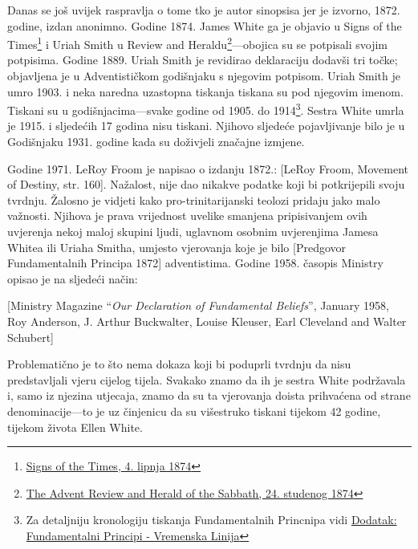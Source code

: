 Danas se još uvijek raspravlja o tome tko je autor sinopsisa jer je izvorno, 1872. godine, izdan anonimno. Godine 1874. James White ga je objavio u Signs of the Times\footnote{\href{https://adventistdigitallibrary.org/adl-364148/signs-times-june-4-1874}{Signs of the Times, 4. lipnja 1874}} i Uriah Smith u Review and Heraldu\footnote{\href{http://documents.adventistarchives.org/Periodicals/RH/RH18741124-V44-22.pdf}{The Advent Review and Herald of the Sabbath, 24. studenog 1874}}—obojica su se potpisali svojim potpisima. Godine 1889. Uriah Smith je revidirao deklaraciju dodavši tri točke; objavljena je u Adventističkom godišnjaku s njegovim potpisom. Uriah Smith je umro 1903. i neka naredna uzastopna tiskanja  tiskana su pod njegovim imenom. Tiskani su u godišnjacima—svake godine od 1905. do 1914\footnote{Za detaljniju kronologiju tiskanja Fundamentalnih Princnipa vidi \hyperref[appendix:timeline]{Dodatak: Fundamentalni Principi - Vremenska Linija}}. Sestra White umrla je 1915. i sljedećih 17 godina  nisu tiskani. Njihovo sljedeće pojavljivanje bilo je u Godišnjaku 1931. godine kada su doživjeli značajne izmjene.

Godine 1971. LeRoy Froom je napisao o izdanju 1872.: [LeRoy Froom, Movement of Destiny, str. 160]. Nažalost, nije dao nikakve podatke koji bi potkrijepili svoju tvrdnju. Žalosno je vidjeti kako pro-trinitarijanski teolozi pridaju  jako malo važnosti. Njihova je prava vrijednost uvelike smanjena pripisivanjem ovih uvjerenja nekoj maloj skupini ljudi, uglavnom osobnim uvjerenjima Jamesa Whitea ili Uriaha Smitha, umjesto vjerovanja koje je bilo [Predgovor Fundamentalnih Principa 1872] adventistima. Godine 1958. časopis Ministry opisao je  na sljedeći način:

[Ministry Magazine “\textit{Our Declaration of Fundamental Beliefs}”, January 1958, Roy Anderson, J. Arthur Buckwalter, Louise Kleuser, Earl Cleveland and Walter Schubert]

Problematično je to što nema dokaza koji bi poduprli tvrdnju da  nisu predstavljali vjeru cijelog tijela. Svakako znamo da ih je sestra White podržavala i, samo iz njezina utjecaja, znamo da su ta vjerovanja doista prihvaćena od strane denominacije—to je uz činjenicu da su višestruko tiskani tijekom 42 godine, tijekom života Ellen White.

